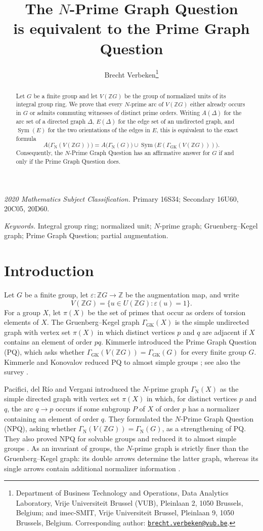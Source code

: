 \documentclass[11pt,a4paper]{article}
\title{The $N$-Prime Graph Question\\
is equivalent to the Prime Graph Question}
\author{Brecht Verbeken\thanks{Department of Business Technology and Operations,
Data Analytics Laboratory, Vrije Universiteit Brussel (VUB), Pleinlaan 2,
1050 Brussels, Belgium; and imec-SMIT, Vrije Universiteit Brussel,
Pleinlaan 9, 1050 Brussels, Belgium. Corresponding author:
\href{mailto:brecht.verbeken@vub.be}{\texttt{brecht.verbeken@vub.be}}.}}
\date{}
\theoremstyle{remark}
\newcommand{\VZG}{V(\mathbb ZG)}
\newcommand{\GN}{\Gamma_{\mathrm N}}
\newcommand{\GGK}{\Gamma_{\mathrm{GK}}}
\newcommand{\eps}{\varepsilon}
\begin{document}
\maketitle

\begin{abstract}
Let $G$ be a finite group and let $V(\mathbb ZG)$ be the group of
normalized units of its integral group ring. We prove that every $N$-prime
arc of $V(\mathbb ZG)$ either already occurs in $G$ or admits commuting
witnesses of distinct prime orders. Writing $A(\Delta)$ for the arc set
of a directed graph $\Delta$, $E(\Delta)$ for the edge set of an
undirected graph, and $\operatorname{Sym}(E)$ for the two orientations of
the edges in $E$, this is equivalent to the exact formula
\[
 A\bigl(\Gamma_{\mathrm N}(V(\mathbb ZG))\bigr)
 =
 A\bigl(\Gamma_{\mathrm N}(G)\bigr)
 \cup
 \operatorname{Sym}\!\bigl(
 E(\Gamma_{\mathrm{GK}}(V(\mathbb ZG)))
 \bigr).
\]
Consequently, the $N$-Prime Graph Question has an affirmative answer for
$G$ if and only if the Prime Graph Question does.
\end{abstract}

\medskip
\noindent\textit{2020 Mathematics Subject Classification.}
Primary 16S34; Secondary 16U60, 20C05, 20D60.

\smallskip
\noindent\textit{Keywords.}
Integral group ring; normalized unit; $N$-prime graph;
Gruenberg--Kegel graph; Prime Graph Question; partial augmentation.

\section{Introduction}

Let $G$ be a finite group, let $\eps\colon\mathbb ZG\to\mathbb Z$ be the
augmentation map, and write
\[
 \VZG=\{u\in U(\mathbb ZG):\eps(u)=1\}.
\]
For a group $X$, let $\pi(X)$ be the set of primes that occur as orders of
torsion elements of $X$. The Gruenberg--Kegel graph $\GGK(X)$ is the simple
undirected graph with vertex set $\pi(X)$ in which distinct vertices $p$ and
$q$ are adjacent if $X$ contains an element of order $pq$. Kimmerle
\cite{Kimmerle2006} introduced the Prime Graph Question (PQ), which asks
whether $\GGK(\VZG)=\GGK(G)$ for every finite group $G$. Kimmerle and
Konovalov reduced PQ to almost simple groups \cite{KimmerleKonovalov}; see
also the survey \cite{MargolisDelRioSurvey}.

Pacifici, del R\'io and Vergani \cite{PRV} introduced the $N$-prime graph
$\GN(X)$ as the simple directed graph with vertex set $\pi(X)$ in which,
for distinct vertices $p$ and $q$, the arc $q\to p$ occurs if some subgroup
$P$ of $X$ of order $p$ has a normalizer containing an element of order
$q$. They formulated the $N$-Prime Graph Question (NPQ), asking whether
$\GN(\VZG)=\GN(G)$, as a strengthening of PQ. They also proved NPQ for
solvable groups and reduced it to almost simple groups
\cite[Theorem~A and Corollary~B]{PRV}. As an invariant of groups, the
$N$-prime graph is strictly finer than the Gruenberg--Kegel graph: its
double arrows determine the latter graph, whereas its single arrows
contain additional normalizer information \cite[Remark~3.1]{PRV}.
\end{document}
